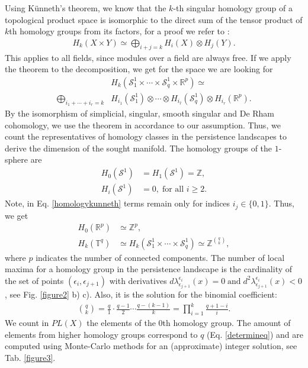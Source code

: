 \documentclass[runningheads,orivec]{llncs}
\begin{document}
Using Künneth's theorem, we know that the $k$-th singular homology group of a topological product space is isomorphic to the direct sum of the tensor product of $k$th homology groups from its factors, for a proof we refer to \cite[p.~268]{hatcher2002algebraic}:
\begin{align}
    H_k(X \times Y) \simeq \bigoplus_{i+j=k}H_i(X) \otimes H_j(Y).
\end{align}
This applies to all fields, since modules over a field are always free. If we apply the theorem to the decomposition, we get for the space we are looking for
\begin{align}
    \label{homologykunneth}
    &H_k(\mathcal{S}^{1}_{1}\times\cdots\times \mathcal{S}^{1}_{q}\times\mathbb{R}^p) \simeq \\
    \bigoplus_{i_{1} + \cdots + i_{r}=k} &H_{i_{1}}(\mathcal{S}^{1}_{1}) \otimes \cdots \otimes H_{i_{\hat{r}}}(\mathcal{S}^{1}_{q}) \otimes H_{i_{r}}(\mathbb{R}^{p}).
\end{align}
By the isomorphism of simplicial, singular, smooth singular and De Rham cohomology, we use the theorem in accordance to our assumption. Thus, we count the representatives of homology classes in the persistence landscapes to derive the dimension of the sought manifold. The homology groups of the $1$-sphere are
\begin{align}
    H_0(\mathcal{S}^1) &= H_1(\mathcal{S}^1) = \mathbb{Z},\\
    H_i(\mathcal{S}^1) &= 0, \; \text{for all } i \geq 2.
\end{align}
Note, in Eq. \ref{homologykunneth} terms remain only for indices $i_{j} \in \{0,1\}$. Thus, we get
\begin{align}
    H_0(\mathbb{R}^p) &\simeq\mathbb{Z}^{p},\\
    \label{determineq}
    H_k(\mathbb{T}^{q}) &\simeq H_k(\mathcal{S}^{1}_{1} \times \cdots \times \mathcal{S}^{1}_{q}) \simeq \mathbb{Z}^{{q\choose{k}}},
\end{align}
where $p$ indicates the number of connected components. The number of local maxima for a homology group in the persistence landscape is the cardinality of the set of points $(\epsilon_i,\epsilon_{j+1})$ with derivatives $d\lambda^{\epsilon_i}_{\epsilon_{j+1}}(x) = 0 \; \text{and} \; d^2 \lambda^{\epsilon_i}_{\epsilon_{j+1}}(x) < 0$, see Fig. \ref{figure2} b) c). Also, it is the solution for the binomial coefficient:
\begin{align}
     {q \choose k} = \frac{q}{1} \cdot \frac{q-1}{2} \cdots \frac{q-(k-1)}{k} = \prod_{i=1}^{k} \frac{q+1-i}{i}.
\end{align} 
We count in $PL(X)$ the elements of the $0$th homology group. The amount of elements from higher homology groups correspond to $q$ (Eq. \ref{determineq}) and are computed using Monte-Carlo methods for an (approximate) integer solution, see Tab. \ref{figure3}.
\end{document}
